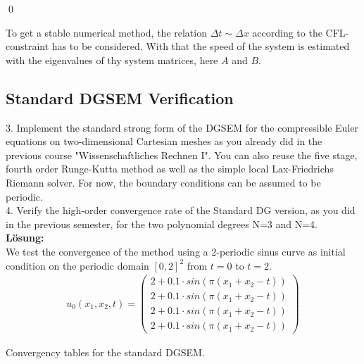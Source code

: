 \documentclass[11pt]{scrartcl}
\begin{document}
\qed

To get a stable numerical method, the relation $\Delta t \sim \Delta x $ according to the CFL-constraint has to be considered. With that the speed of the system is estimated with the eigenvalues of thy system matrices, here $A$ and $B$. 

\subsection{Standard DGSEM Verification}
3. Implement the standard strong form of the DGSEM for the compressible Euler equations on two-dimensional Cartesian meshes as you already did in the previous course "Wissenschaftliches Rechnen I". You can also reuse the five stage, fourth order Runge-Kutta method as well as the simple local Lax-Friedrichs Riemann solver. For now, the boundary conditions can be assumed to be periodic. \\
4. Verify the high-order convergence rate of the Standard DG version, as you did in the previous semester, for the two polynomial degrees N=3 and N=4. \\
\newline
\textbf{Lösung:} \\
We test the convergence of the method using a $2$-periodic sinus curve as initial condition on the periodic domain $[0, 2]^2$ from $t=0$ to $t=2$.
\begin{align}
u_0(x_1, x_2, t) = 
\begin{pmatrix}
2 + 0.1 \cdot sin( \pi (x_1 + x_2 - t)) \\
2 + 0.1 \cdot sin( \pi (x_1 + x_2 - t)) \\
2 + 0.1 \cdot sin( \pi (x_1 + x_2 - t)) \\
2 + 0.1 \cdot sin( \pi (x_1 + x_2 - t))
\end{pmatrix}
\label{Anfangsbedingung Konvergenz}
\end{align}

Convergency tables for the standard DGSEM.
\end{document}
